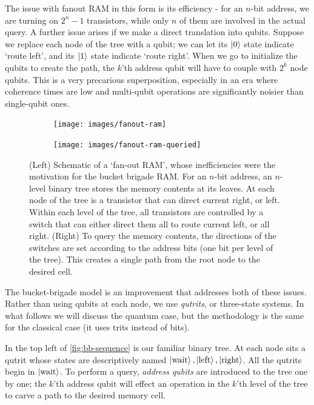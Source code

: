\documentclass[a4paper,12pt]{article}
\begin{document}
The issue with fanout RAM in this form is its efficiency - for an $n$-bit address, we are turning on $2^n - 1$ transistors, while only $n$ of them are involved in the actual query. 
A further issue arises if we make a direct translation into qubits. 
Suppose we replace each node of the tree with a qubit; we can let its $\ket{0}$ state indicate `route left', and its $\ket{1}$ state indicate `route right'. 
When we go to initialize the qubits to create the path, the $k$'th address qubit will have to couple with $2^k$ node qubits. 
This is a very precarious superposition, especially in an era where coherence times are low and multi-qubit operations are significantly noisier than single-qubit ones.

\begin{figure}[ht!]
 \centering
  \captionsetup{width=.89\linewidth}
 \begin{subfigure}{0.45\textwidth}
    \centering
    \texttt{[image: images/fanout-ram]}
 \end{subfigure}
  \hspace{0.5cm}
  \begin{subfigure}{0.45\textwidth} 
    \centering
    \texttt{[image: images/fanout-ram-queried]}
 \end{subfigure} 
    \caption{(Left) Schematic of a `fan-out RAM', whose inefficiencies were the motivation for the bucket brigade RAM. 
    For an $n$-bit address, an $n$-level binary tree stores the memory contents at its leaves. 
    At each node of the tree is a transistor that can direct current right, or left. 
    Within each level of the tree, all transistors are controlled by a switch that can either direct them all to route current left, or all right. 
    (Right) To query the memory contents, the directions of the switches are set according to the address bits (one bit per level of the tree). 
    This creates a single path from the root node to the desired cell.}
    \label{fig:fanout-ram-sequence}
\end{figure}

The bucket-brigade model is an improvement that addresses both of these issues.
Rather than using qubits at each node, we use \emph{qutrits}, or three-state systems. 
In what follows we will discuss the quantum case, but the methodology is the same for the classical case (it uses trits instead of bits).

In the top left of \autoref{fig:bb-sequence} is our familiar binary tree. 
At each node sits a qutrit whose states are descriptively named $\ket{\hbox{wait}}, \ket{\hbox{left}}, \ket{\hbox{right}}$. 
All the qutrits begin in $\ket{\hbox{wait}}$. 
To perform a query, \emph{address qubits} are introduced to the tree one by one; the $k$'th address qubit will effect an operation in the $k$'th level of the tree to carve a path to the desired memory cell.
\end{document}
